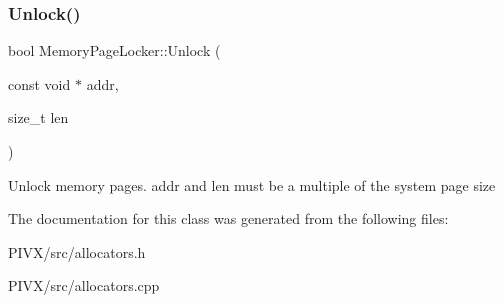 \subsubsection{\texorpdfstring{Unlock()}{Unlock()}}
{\footnotesize\ttfamily bool Memory\+Page\+Locker\+::\+Unlock (\begin{DoxyParamCaption}\item[{const void $\ast$}]{addr,  }\item[{size\+\_\+t}]{len }\end{DoxyParamCaption})}

Unlock memory pages. addr and len must be a multiple of the system page size 

The documentation for this class was generated from the following files\+:\begin{DoxyCompactItemize}
\item 
P\+I\+V\+X/src/allocators.\+h\item 
P\+I\+V\+X/src/allocators.\+cpp\end{DoxyCompactItemize}
